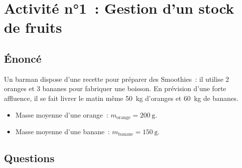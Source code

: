 \documentclass[10pt,a4paper]{article}
\begin{document}
\section*{Activité n°1~: Gestion d'un stock de fruits}

\subsection*{Énoncé}
Un barman dispose d'une recette pour préparer des Smoothies~: il utilise 2 oranges et 3 bananes pour fabriquer
une boisson. En prévision d'une forte affluence, il se fait livrer le matin même
\SI{50}{\kilo\gram} d'oranges et \SI{60}{\kilo\gram} de bananes.

\begin{itemize}
    \item Masse moyenne d'une orange~: $m_{\text{orange}} = \SI{200}{\gram}$.
    \item Masse moyenne d'une banane~: $m_{\text{banane}} = \SI{150}{\gram}$.
\end{itemize}

\subsection*{Questions}
\end{document}
